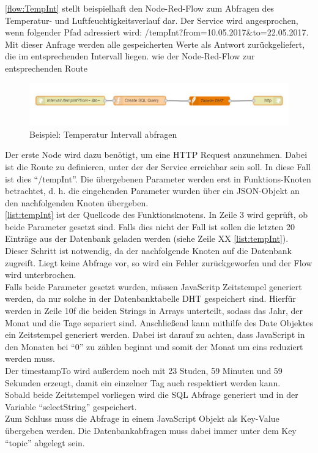 \autoref{flow:TempInt} stellt beispielhaft den Node-Red-Flow zum Abfragen des Temperatur- und Luftfeuchtigkeitsverlauf dar. Der Service wird angesprochen, wenn folgender Pfad adressiert wird: /tempInt?from=10.05.2017\&to=22.05.2017. Mit dieser Anfrage werden alle gespeicherten Werte als Antwort zurückgeliefert, die im entsprechenden Intervall liegen. wie der Node-Red-Flow zur entsprechenden Route 

\begin{figure}[h]
	\centering
	\includegraphics[scale=0.7]{images/tempIntFlow}
	\caption{Beispiel: Temperatur Intervall abfragen}
	\label{flow:TempInt}
\end{figure}
Der erste Node wird dazu benötigt, um eine HTTP Request anzunehmen. Dabei ist die Route zu definieren, unter der der Service erreichbar sein soll. In diese Fall ist dies \enquote{/tempInt}. Die übergebenen Parameter werden erst in Funktions-Knoten betrachtet, d. h. die eingehenden Parameter wurden über ein JSON-Objekt an den nachfolgenden Knoten übergeben. 
\\\autoref{list:tempInt} ist der Quellcode des Funktionsknotens. In Zeile 3 wird geprüft, ob beide Parameter gesetzt sind. Falls dies nicht der Fall ist sollen die letzten 20 Einträge aus der Datenbank geladen werden (siehe Zeile XX \autoref{list:tempInt}). Dieser Schritt ist notwendig, da der nachfolgende Knoten auf die Datenbank zugreift. Liegt keine Abfrage vor, so wird ein Fehler zurückgeworfen und der Flow wird unterbrochen. 
\\Falls beide Parameter gesetzt wurden, müssen JavaScritp Zeitstempel generiert werden, da nur solche in der Datenbanktabelle DHT gespeichert sind. Hierfür werden in Zeile 10f die beiden Strings in Arrays unterteilt, sodass das Jahr, der Monat und die Tage separiert sind. Anschließend kann mithilfe des Date Objektes ein Zeitstempel generiert werden. Dabei ist darauf zu achten, dass JavaScript in den Monaten bei \enquote{0} zu zählen beginnt und somit der Monat um eins reduziert werden muss. \\Der timestampTo wird außerdem noch mit 23 Studen, 59 Minuten und 59 Sekunden erzeugt, damit ein einzelner Tag auch respektiert werden kann. \\Sobald beide Zeitstempel vorliegen wird die \ac{SQL} Abfrage generiert und in der Variable \enquote{selectString} gespeichert. \\Zum Schluss muss die Abfrage in einem JavaScript Objekt als Key-Value übergeben werden. Die Datenbankabfragen muss dabei immer unter dem Key \enquote{topic} abgelegt sein.  

